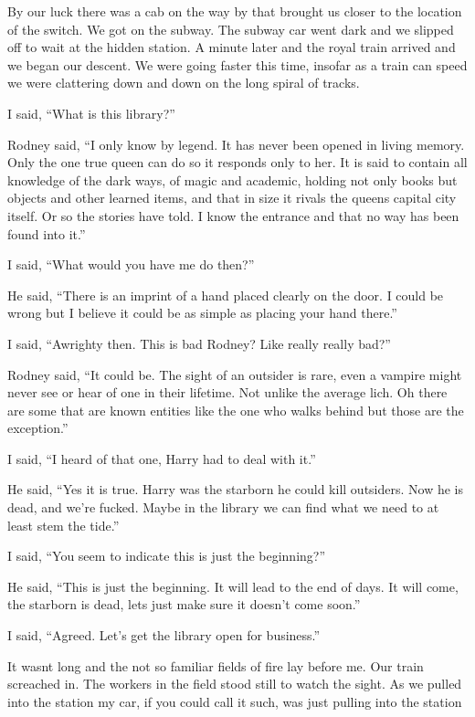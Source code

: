 By our luck there was a cab on the way by that brought us closer to the location of the switch. We got on the subway. The subway car went dark and we slipped off to wait at the hidden station. A minute later and the royal train arrived and we began our descent. We were going faster this time, insofar as a train can speed we were clattering down and down on the long spiral of tracks.

I said, ``What is this library?''

Rodney said, ``I only know by legend. It has never been opened in living memory. Only the one true queen can do so it responds only to her. It is said to contain all knowledge of the dark ways, of magic and academic, holding not only books but objects and other learned items, and that in size it rivals the queens capital city itself. Or so the stories have told. I know the entrance and that no way has been found into it.''

I said, ``What would you have me do then?''

He said, ``There is an imprint of a hand placed clearly on the door. I could be wrong but I believe it could be as simple as placing your hand there.''

I said, ``Awrighty then. This is bad Rodney? Like really really bad?''

Rodney said, ``It could be. The sight of an outsider is rare, even a vampire might never see or hear of one in their lifetime. Not unlike the average lich. Oh there are some that are known entities like the one who walks behind but those are the exception.''

I said, ``I heard of that one, Harry had to deal with it.''

He said, ``Yes it is true. Harry was the starborn he could kill outsiders. Now he is dead, and we're fucked. Maybe in the library we can find what we need to at least stem the tide.''

I said, ``You seem to indicate this is just the beginning?''

He said, ``This is just the beginning. It will lead to the end of days. It will come, the starborn is dead, lets just make sure it doesn't come soon.''

I said, ``Agreed. Let's get the library open for business.''

It wasnt long and the not so familiar fields of fire lay before me. Our train screached in. The workers in the field stood still to watch the sight. As we pulled into the station my car, if you could call it such, was just pulling into the station